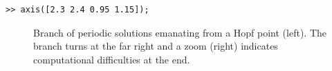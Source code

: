 \documentclass[10pt]{article}
\begin{document}
{{\small\begin{verbatim}
>> axis([2.3 2.4 0.95 1.15]);
\end{verbatim}}
\begin{figure}[h]
\begin{center}
\end{center}
\caption{\small\label{ride9_pic}Branch of periodic solutions emanating
from a Hopf point (left). The branch turns at the far right and a zoom (right)
indicates computational difficulties at the end.} 
\end{figure}
}
\end{document}
